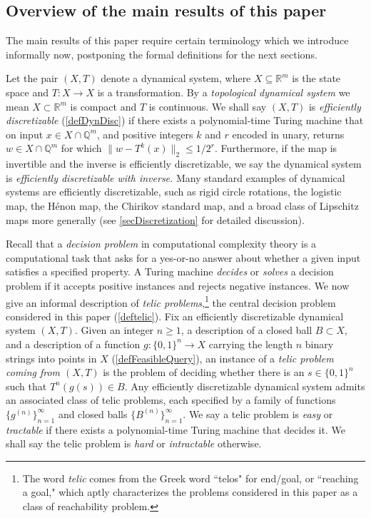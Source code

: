 \documentclass{amsart}
\theoremstyle{theorem}
\theoremstyle{remark}
\numberwithin{equation}{section}
\newcommand{\QQ}{\mathbb{Q}}
\newcommand{\RR}{\mathbb{R}}
\begin{document}
\subsection{Overview of the main results of this paper}
The main results of this paper require certain terminology which we introduce informally now, postponing the formal definitions for the next sections.

Let the pair $(X, T)$ denote a dynamical system, where $X\subseteq \RR^m$ is the state space and $T:X\rightarrow X$ is a transformation. By a \emph{topological dynamical system} we mean $X\subset \RR^m$ is compact and $T$ is continuous.
We shall say $(X, T)$ is \emph{efficiently discretizable} (\cref{defDynDisc}) if there exists a polynomial-time Turing machine that on input $x \in X \cap \QQ^m$, and positive integers $k$ and $r$ encoded in unary, returns $w \in X\cap \QQ^m$ for which $\|w-T^k(x)\|_2 \leq 1/2^r$.
Furthermore, if the map is invertible and the inverse is efficiently discretizable, we say the dynamical system is \emph{efficiently discretizable with inverse.}
Many standard examples of dynamical systems are efficiently discretizable, such as rigid circle rotations, the logistic map, the H\'enon map, the Chirikov standard map, and a broad class of Lipschitz maps more generally (see \cref{secDiscretization} for detailed discussion).

Recall that a \emph{decision problem} in computational complexity theory is a computational task that asks for a yes-or-no answer about whether a given input satisfies a specified property. A Turing machine \emph{decides} or \emph{solves} a decision problem if it accepts positive instances and rejects negative instances.
We now give an informal description of \emph{telic problems},\footnote{The word \emph{telic} comes from the Greek word ``telos" for end/goal, or ``reaching a goal," which aptly characterizes the problems considered in this paper as a class of reachability problem.} the central decision problem considered in this paper (\cref{deftelic}).
Fix an efficiently discretizable dynamical system $(X, T)$.
Given an integer $n\geq 1$, a description of a closed ball $B \subset X$, and a description of a function $g:\{0,1\}^n\rightarrow X$ carrying the length $n$ binary strings into points in $X$ (\cref{defFeasibleQuery}), an instance of a \emph{telic problem coming from $(X, T)$} is the problem of deciding whether there is an $s \in \{0,1\}^n$ such that $T^{n}(g(s)) \in B$. Any efficiently discretizable dynamical system admits an associated class of telic problems, each specified by a family of functions $\{g^{(n)}\}_{n=1}^\infty$ and closed balls $\{B^{(n)}\}_{n=1}^\infty$. We say a telic problem is \emph{easy} or \emph{tractable} if there exists a polynomial-time Turing machine that decides it. We shall say the telic problem is \emph{hard} or \emph{intractable} otherwise.
\end{document}
